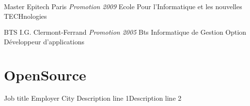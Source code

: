 \documentclass[11pt,a4paper,sans]{moderncv}
\begin{document}
{Master}
{Epitech}
{Paris}
{\textit{Promotion 2009}}
{Ecole Pour l'Informatique et les nouvelles TECHnologies}

{BTS}
{I.G.}
{Clermont-Ferrand}
{\textit{Promotion 2005}}
{Bts Informatique de Gestion Option D\'{e}veloppeur d'applications}

\section{OpenSource}

{Job title}
{Employer}
{City}
{}
{Description line 1\newline{}Description line 2}
\end{document}
